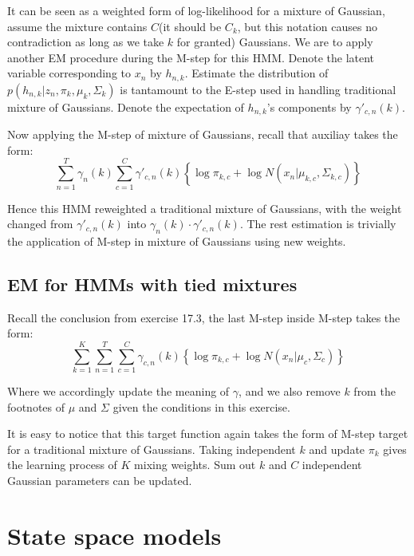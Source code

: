 \documentclass[UTF8]{ctexart}
\begin{document}
It can be seen as a weighted form of log-likelihood for a mixture of Gaussian, assume the mixture contains $C$(it should be $C_{k}$, but this notation causes no contradiction as long as we take $k$ for granted) Gaussians. We are to apply another EM procedure during the M-step for this HMM. Denote the latent variable corresponding to $x_{n}$ by $h_{n,k}$. Estimate the distribution of $p(h_{n,k}|z_{n},\pi_{k},\mu_{k},\Sigma_{k})$ is tantamount to the E-step used in handling traditional mixture of Gaussians. Denote the expectation of $h_{n,k}$'s components by $\gamma'_{c,n}(k)$.

Now applying the M-step of mixture of Gaussians, recall that auxiliay takes the form:
$$\sum_{n=1}^{T}\gamma_{n}(k)\sum_{c=1}^{C}\gamma'_{c,n}(k)\left\{\log \pi_{k,c}+\log N(x_{n}|\mu_{k,c},\Sigma_{k,c}) \right\}$$

Hence this HMM reweighted a traditional mixture of Gaussians, with the weight changed from $\gamma'_{c,n}(k)$ into $\gamma_{n}(k)\cdot \gamma'_{c,n}(k)$. The rest estimation is trivially the application of M-step in mixture of Gaussians using new weights.

\subsection{EM for HMMs with tied mixtures}
Recall the conclusion from exercise 17.3, the last M-step inside M-step takes the form:
$$\sum_{k=1}^{K}\sum_{n=1}^{T}\sum_{c=1}^{C}\gamma_{c,n}(k)\left\{ \log \pi_{k,c} + \log N(x_{n}|\mu_{c},\Sigma_{c}) \right\}$$

Where we accordingly update the meaning of $\gamma$, and we also remove $k$ from the footnotes of $\mu$ and $\Sigma$ given the conditions in this exercise.

It is easy to notice that this target function again takes the form of M-step target for a traditional mixture of Gaussians. Taking independent $k$ and update $\pi_{k}$ gives the learning process of $K$ mixing weights. Sum out $k$ and $C$ independent Gaussian parameters can be updated.

\newpage
\section{State space models}
\end{document}
